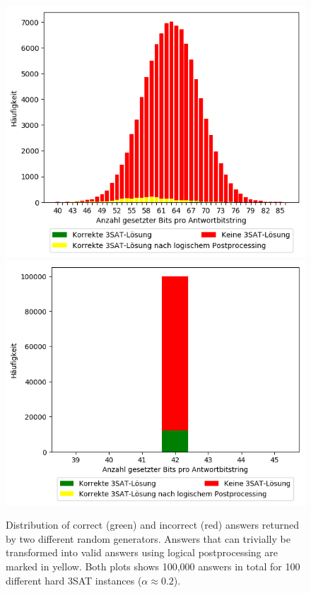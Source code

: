 \begin{figure}
\centering
\includegraphics[width=.5\textwidth]{../material_2/42_clauses__0_2_def_RANDOM_color_transformed.png}%
\includegraphics[width=.5\textwidth]{../material_2/42_clauses__0_2_def_RANDOM_CLEVER_color_transformed.png}
\caption{Distribution of correct (green) and incorrect (red) answers returned by two different random generators. Answers that can trivially be transformed into valid answers using logical postprocessing are marked in yellow. Both plots shows 100,000 answers in total for 100 different hard 3SAT instances ($\alpha \approx 0.2$).} \label{fig:distr-random}
\end{figure}


